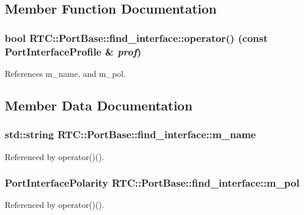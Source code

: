 \subsection{Member Function Documentation}
\subsubsection[{operator()}]{\setlength{\rightskip}{0pt plus 5cm}bool RTC::PortBase::find\_\-interface::operator() (const PortInterfaceProfile \& {\em prof})\hspace{0.3cm}{\ttfamily  [inline]}}\label{structRTC_1_1PortBase_1_1find__interface_a68d0b425d5ba86e6d118b0bb088a94c4}


References m\_\-name, and m\_\-pol.



\subsection{Member Data Documentation}
\subsubsection[{m\_\-name}]{\setlength{\rightskip}{0pt plus 5cm}std::string {\bf RTC::PortBase::find\_\-interface::m\_\-name}}\label{structRTC_1_1PortBase_1_1find__interface_a6a60bc810b70be94985e0e912fb66efe}


Referenced by operator()().

\subsubsection[{m\_\-pol}]{\setlength{\rightskip}{0pt plus 5cm}PortInterfacePolarity {\bf RTC::PortBase::find\_\-interface::m\_\-pol}}\label{structRTC_1_1PortBase_1_1find__interface_a762775406f1eefad0406aecbfce55d98}


Referenced by operator()().

